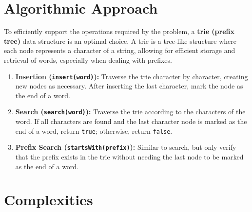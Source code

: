
\section*{Algorithmic Approach}

To efficiently support the operations required by the problem, a \textbf{trie (prefix tree)} data structure is an optimal choice. A trie is a tree-like structure where each node represents a character of a string, allowing for efficient storage and retrieval of words, especially when dealing with prefixes.

\begin{enumerate}
    \item \textbf{Insertion (\texttt{insert(word)}):}  
    Traverse the trie character by character, creating new nodes as necessary. After inserting the last character, mark the node as the end of a word.
    
    \item \textbf{Search (\texttt{search(word)}):}  
    Traverse the trie according to the characters of the word. If all characters are found and the last character node is marked as the end of a word, return \texttt{true}; otherwise, return \texttt{false}.
    
    \item \textbf{Prefix Search (\texttt{startsWith(prefix)}):}  
    Similar to search, but only verify that the prefix exists in the trie without needing the last node to be marked as the end of a word.
\end{enumerate}


\section*{Complexities}

